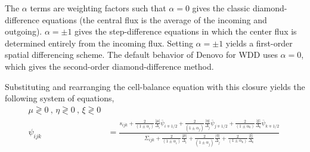 \documentclass[12pt]{article}
\newcommand{\Di}{\ensuremath{\Delta_i}}
\newcommand{\Dj}{\ensuremath{\Delta_j}}
\newcommand{\Dk}{\ensuremath{\Delta_k}}
\begin{document}
The $\alpha$
terms are weighting factors such that $\alpha=0$ gives the classic
diamond-difference equations (the central flux is the average of the incoming and outgoing). $\alpha = \pm 1$ gives the step-difference
equations in which the center flux is determined entirely from the incoming flux.  Setting $\alpha = \pm 1$ yields a first-order spatial differencing
scheme.  The default behavior of Denovo for WDD uses $\alpha=0$, which gives
the second-order diamond-difference method.

Substituting and rearranging the cell-balance
equation with this closure yields the following system of equations,
\begin{equation}
  \begin{aligned} \mu\gtrless0\:,\,\eta\gtrless0\:,\,\xi\gtrless0\\
    \psi_{ijk} &= \frac{s_{ijk} +
      \frac{2}{(1\pm\alpha_i)}\frac{|\mu|}{\Di}\bar{\psi}_{i\mp1/2} +
      \frac{2}{(1\pm\alpha_j)}\frac{|\eta|}{\Dj}\bar{\psi}_{j\mp1/2} +
      \frac{2}{(1\pm\alpha_k)}\frac{|\xi|}{\Dk}\bar{\psi}_{k\mp1/2}}{
      \Sigma_{ijk} + \frac{2}{(1\pm\alpha_i)}\frac{|\mu|}{\Di} +
      \frac{2}{(1\pm\alpha_j)}\frac{|\eta|}{\Dj} +
      \frac{2}{(1\pm\alpha_k)}\frac{|\xi|}{\Dk} }\:
  \end{aligned}
  \label{eq:wdd}
\end{equation}
\end{document}
